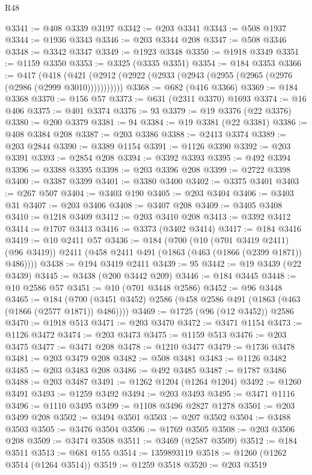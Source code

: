 \begin{lexlean}{R48}
\begin{coremodule}
@3341 := @408 @3339 @3197
@3342 := @203 @3341
@3343 := @508 @1937
@3344 := @1936 @3343
@3346 := @203 @3344 @208
@3347 := @508 @3346
@3348 := @3342 @3347
@3349 := @1923 @3348
@3350 := @1918 @3349
@3351 := @1159 @3350
@3353 := @3325 (@3335 @3351)
@3354 := @184 @3353
@3366 := @417
    (@418 (@421 (@2912 (@2922 (@2933 (@2943 (@2955 (@2965 (@2976 (@2986 (@2999 @3010)))))))))))
@3368 := @682 (@416 @3366)
@3369 := @184 @3368
@3370 := @156 @57
@3373 := @631 (@2311 @3370) @1693
@3374 := @16 @406
@3375 := @401 @3374
@3376 := 93
@3379 := @19 @3376 (@22 @3376)
@3380 := @200 @3379
@3381 := 94
@3384 := @19 @3381 (@22 @3381)
@3386 := @408 @3384 @208
@3387 := @203 @3386
@3388 := @2413 @3374
@3389 := @203 @2844
@3390 := @3389 @1154
@3391 := @1126 @3390
@3392 := @203 @3391
@3393 := @2854 @208
@3394 := @3392 @3393
@3395 := @492 @3394
@3396 := @3388 @3395
@3398 := @203 @3396 @208
@3399 := @2722 @3398
@3400 := @3387 @3399
@3401 := @3380 @3400
@3402 := @3375 @3401
@3403 := @267 @507
@3404 := @3403 @190
@3405 := @203 @3404
@3406 := @3403 @31
@3407 := @203 @3406
@3408 := @3407 @208
@3409 := @3405 @3408
@3410 := @1218 @3409
@3412 := @203 @3410 @208
@3413 := @3392 @3412
@3414 := @1707 @3413
@3416 := @3373 (@3402 @3414)
@3417 := @184 @3416
@3419 := @10 @2411 @57
@3436 := @184
    (@700
      (@10 (@701 @3419 @2411) (@96 @3419))
      @2411
      (@458 @2411 @491 (@1863 (@463 (@1866 (@2399 @1871)) @486))))
@3438 := @194 @3419 @2411
@3439 := 95
@3442 := @19 @3439 (@22 @3439)
@3445 := @3438 (@200 @3442 @209)
@3446 := @184 @3445
@3448 := @10 @2586 @57
@3451 := @10 (@701 @3448 @2586)
@3452 := @96 @3448
@3465 := @184 (@700 (@3451 @3452) @2586 (@458 @2586 @491 (@1863 (@463 (@1866 (@2577 @1871)) @486))))
@3469 := @1725 (@96 (@12 @3452)) @2586
@3470 := @1918 @513
@3471 := @203 @3470
@3472 := @3471 @1154
@3473 := @1126 @3472
@3474 := @203 @3473
@3475 := @1159 @513
@3476 := @203 @3475
@3477 := @3471 @208
@3478 := @1210 @3477
@3479 := @1736 @3478
@3481 := @203 @3479 @208
@3482 := @508 @3481
@3483 := @1126 @3482
@3485 := @203 @3483 @208
@3486 := @492 @3485
@3487 := @1787 @3486
@3488 := @203 @3487
@3491 := @1262 @1204 (@1264 @1204)
@3492 := @1260 @3491
@3493 := @1259 @3492
@3494 := @203 @3493
@3495 := @3471 @1116
@3496 := @1110 @3495
@3499 := @1108 @3496 @2827 @1278
@3501 := @203 @3499 @208
@3502 := @3494 @3501
@3503 := @207 @3502
@3504 := @3488 @3503
@3505 := @3476 @3504
@3506 := @1769 @3505
@3508 := @203 @3506 @208
@3509 := @3474 @3508
@3511 := @3469 (@2587 @3509)
@3512 := @184 @3511
@3513 := @681 @155
@3514 := 1359893119
@3518 := @1260 (@1262 @3514 (@1264 @3514))
@3519 := @1259 @3518
@3520 := @203 @3519

\end{coremodule}
\end{lexlean}

